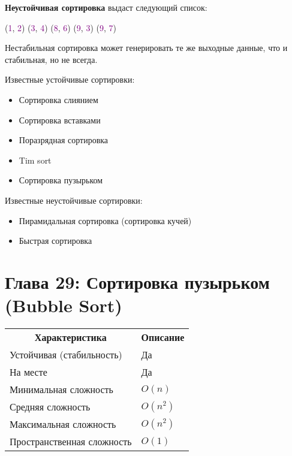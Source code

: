 \vspace{\baselineskip}

\textbf{Неустойчивая сортировка} выдаст следующий список:

\vspace{\baselineskip}

\begin{tcolorbox} 
(\textcolor{Purple}{1}, \textcolor{Purple}{2}) (\textcolor{Purple}{3}, \textcolor{Purple}{4}) (\textcolor{Purple}{8}, \textcolor{Purple}{6}) (\textcolor{Purple}{9}, \textcolor{Purple}{3}) (\textcolor{Purple}{9}, \textcolor{Purple}{7})
\end{tcolorbox}

\vspace{\baselineskip}

Нестабильная сортировка может генерировать те же выходные данные, что и стабильная, но не всегда.

\vspace{\baselineskip}

Известные устойчивые сортировки:

\begin{itemize}
\item Сортировка слиянием
\item Сортировка вставками
\item Поразрядная сортировка
\item Tim sort
\item Сортировка пузырьком
\end{itemize}

Известные неустойчивые сортировки:

\begin{itemize}
\item Пирамидальная сортировка (сортировка кучей)
\item Быстрая сортировка
\end{itemize}

\chapter*{Глава 29: Сортировка пузырьком (Bubble Sort)}

\begin{tabular}{ll}
\multicolumn{1}{c}{\textbf{Характеристика}}& \multicolumn{1}{c}{\textbf{Описание}} \\[5pt]
\ttfamily Устойчивая (стабильность) & Да \\[5pt]
\ttfamily На месте & Да \\[5pt]
\ttfamily Минимальная сложность & $O(n)$ \\[5pt]
\ttfamily Средняя сложность & $O(n^2)$ \\[5pt]
\ttfamily Максимальная сложность & $O(n^2)$ \\[5pt]
\ttfamily Пространственная сложность & $O(1)$ \\[5pt]
\end{tabular}

